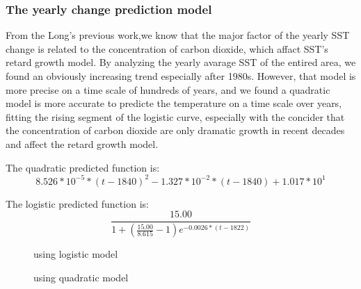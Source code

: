 \documentclass{mcmthesis}
\begin{document}
    

  \subsubsection{The yearly change prediction model}
    From the Long's previous work\cite{long2014fast},we know that the major factor of the yearly SST change is related to the concentration of carbon dioxide, which affact SST's retard growth model. By analyzing the yearly avarage SST of the entired area, we found an obviously increasing trend especially after 1980s. However, that model is more precise on a time scale of hundreds of years, and we found a quadratic model is more accurate to predicte the temperature on a time scale over years, fitting the rising segment of the logistic curve, especially with the concider that the concentration of carbon dioxide are only dramatic growth in recent decades and affect the retard growth model. 
   
    The quadratic predicted function is:
    \begin{equation}
        8.526*10^{-5}*(t-1840)^2-1.327*10^{-2}*(t-1840)+1.017*10^1
    \end{equation}
    
    The logistic predicted function is:
    \begin{equation}
      \frac{15.00}{1+(\frac{15.00}{8.615}-1)e^{-0.0026*(t-1822)}}
    \end{equation}

    \begin{figure}[htbp]
      \caption{using logistic model}\label{figure1}
    \end{figure}
    \begin{figure}[htbp]
      \caption{using quadratic model}\label{figure1}
    \end{figure}
    
\end{document}
